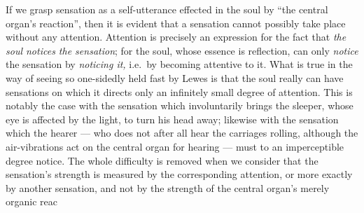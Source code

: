 \documentclass[12pt,a4paper]{book}
\begin{document}
If we grasp sensation as a self-utterance effected in the soul by ``the central
organ's reaction'', then it is evident that a sensation cannot possibly take place
without any attention. Attention is precisely an expression for the fact that
\emph{the soul notices the sensation}; for the soul, whose essence is reflection, can
only \emph{notice} the sensation by \emph{noticing it,} i.e.\ by becoming attentive to
it. What is true in the way of seeing so one-sidedly held fast by Lewes is that the
soul really can have sensations on which it directs only an infinitely small degree of
attention. This is notably the case with the sensation which involuntarily brings the
sleeper, whose eye is affected by the light, to turn his head away; likewise with the
sensation which the hearer --- who does not after all hear the carriages rolling,
although the air-vibrations act on the central organ for hearing --- must to an
imperceptible degree notice. The whole difficulty is removed when we consider that the
sensation's strength is measured by the corresponding attention, or more exactly by
another sensation, and not by the strength of the central organ's merely organic
reac%
\setcounter{footnote}{0}%
\end{document}
